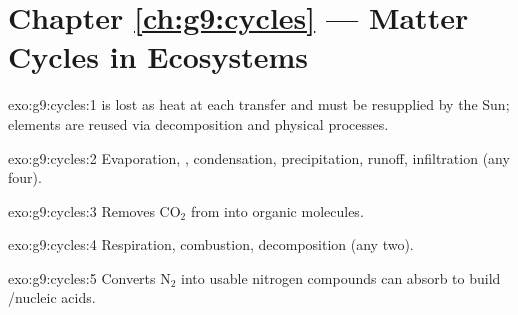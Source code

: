 \section*{Chapter \ref{ch:g9:cycles} --- Matter Cycles in Ecosystems}

\begin{solution}{exo:g9:cycles:1}
 is lost as heat at each transfer and must be resupplied by the Sun;
elements are reused via decomposition and physical processes.
\end{solution}

\begin{solution}{exo:g9:cycles:2}
Evaporation, , condensation, precipitation, runoff,
infiltration (any four).
\end{solution}

\begin{solution}{exo:g9:cycles:3}
Removes $\mathrm{CO_2}$ from  into organic molecules.
\end{solution}

\begin{solution}{exo:g9:cycles:4}
Respiration, combustion, decomposition (any two).
\end{solution}

\begin{solution}{exo:g9:cycles:5}
Converts $\mathrm{N_2}$ into usable nitrogen compounds  can absorb
to build /nucleic acids.
\end{solution}

